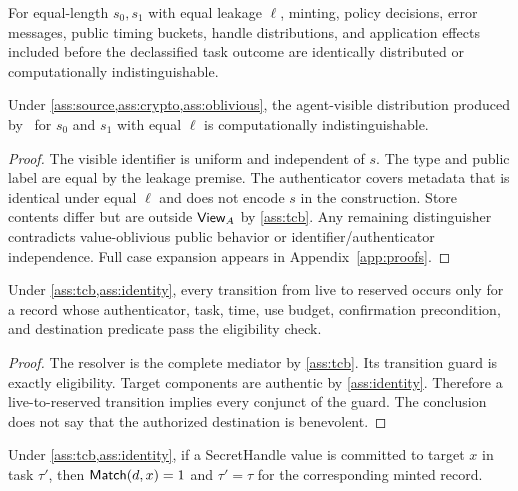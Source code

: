\begin{assumption}
\label{ass:oblivious}
For equal-length $s_0,s_1$ with equal leakage $\ell$, minting, policy decisions, error messages, public timing buckets, handle distributions, and application effects included before the declassified task outcome are identically distributed or computationally indistinguishable.
\end{assumption}

\begin{lemma}
\label{lem:mint}
Under \cref{ass:source,ass:crypto,ass:oblivious}, the agent-visible distribution produced by \Mint\ for $s_0$ and $s_1$ with equal $\ell$ is computationally indistinguishable.
\end{lemma}

\begin{proof}
The visible identifier is uniform and independent of $s$. The type and public label are equal by the leakage premise. The authenticator covers metadata that is identical under equal $\ell$ and does not encode $s$ in the construction. Store contents differ but are outside $\mathsf{View}_A$ by \cref{ass:tcb}. Any remaining distinguisher contradicts value-oblivious public behavior or identifier/authenticator independence. Full case expansion appears in Appendix~\ref{app:proofs}.
\end{proof}

\begin{lemma}
\label{lem:resolve}
Under \cref{ass:tcb,ass:identity}, every transition from live to reserved occurs only for a record whose authenticator, task, time, use budget, confirmation precondition, and destination predicate pass the eligibility check.
\end{lemma}

\begin{proof}
The resolver is the complete mediator by \cref{ass:tcb}. Its transition guard is exactly eligibility. Target components are authentic by \cref{ass:identity}. Therefore a live-to-reserved transition implies every conjunct of the guard. The conclusion does not say that the authorized destination is benevolent.
\end{proof}

\begin{theorem}
\label{thm:confinement}
Under \cref{ass:tcb,ass:identity}, if a SecretHandle value is committed to target $x$ in task $\tau'$, then $\mathsf{Match}(d,x)=1$ and $\tau'=\tau$ for the corresponding minted record.
\end{theorem}

